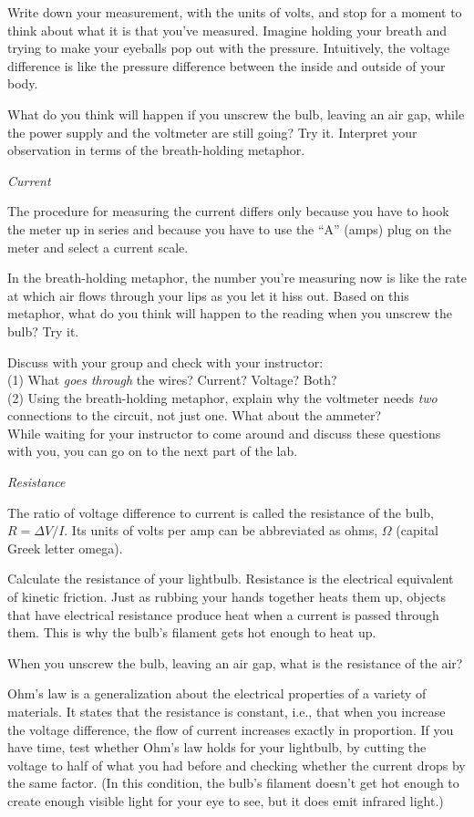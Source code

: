 Write down your measurement, with the units of volts, and stop
for a moment to think about what it is that you've measured.
Imagine holding your breath and trying to make your eyeballs
pop out with the pressure. 
Intuitively, the voltage difference is like the pressure difference
between the inside and outside of your body.

What do you think will happen if you unscrew the bulb, leaving
an air gap, while the
power supply and the voltmeter are still going? Try it.
Interpret your observation in terms of the breath-holding
metaphor.

\emph{Current}

The procedure for measuring the current differs only because
you have to hook the meter up in series and because you have
to use the ``A'' (amps) plug on the meter and select a current
scale.

In the breath-holding metaphor, the number you're measuring
now is like the rate at which air flows 
through your lips as you let it hiss out. Based on this
metaphor, what do you think will happen to the reading when
you unscrew the bulb? Try it.

Discuss with your group and check with your instructor:\\
(1) What \emph{goes through} the wires? Current? Voltage? Both?\\
(2) Using the breath-holding metaphor, explain why the voltmeter
needs \emph{two} connections to the circuit, not just one.
What about the ammeter?\\
While waiting for your instructor to come around and discuss
these questions with you, you can go on to the next part of
the lab.

\emph{Resistance}

The ratio of voltage difference to current is called the resistance
of the bulb, $R=\Delta V/I$. Its units of volts per amp can be
abbreviated as ohms, $\Omega$ (capital Greek letter omega).

Calculate the resistance of your lightbulb. Resistance is the
electrical equivalent of kinetic friction. Just as rubbing
your hands together heats them up, objects that have
electrical resistance produce heat when a current is passed
through them. This is why the bulb's filament gets hot enough
to heat up.

When you unscrew the bulb, leaving an air gap, what is the
resistance of the air?

Ohm's law is a generalization about the electrical properties
of a variety of materials. It states that the resistance is
constant, i.e., that when you increase the voltage difference,
the flow of current increases exactly in proportion.
If you have time, test whether Ohm's law holds for your
lightbulb, by cutting the voltage to half of what you had
before and checking whether the current drops by the same factor.
(In this condition, the bulb's filament doesn't get
hot enough to create enough visible light for your eye to see,
but it does emit infrared light.)

